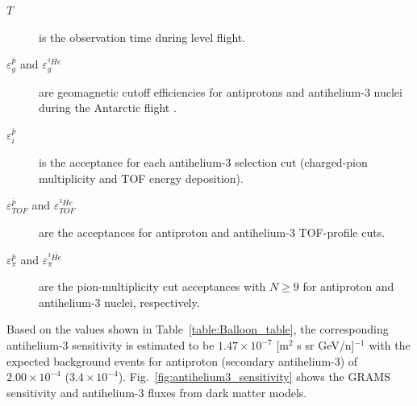 \begin{table}
\begin{description}
    \item[$T$] is the observation time during level flight.
    \item[$\varepsilon_g^{\bar{p}}$ and $\varepsilon_g^{^3\overline{He}}$] are geomagnetic cutoff efficiencies for antiprotons and antihelium-3 nuclei during the Antarctic flight \cite{vonDoetinchem:2017Id}.
    \item[$\varepsilon_i^{\bar{p}}$] is the acceptance for each antihelium-3 selection cut (charged-pion multiplicity and TOF energy deposition).
    \item[$\varepsilon_{TOF}^{\bar{p}}$ and $\varepsilon_{TOF}^{^3\overline{He}}$] are the acceptances for antiproton and antihelium-3 TOF-profile cuts.
    \item[$\varepsilon_{\pi}^{\bar{p}}$ and $\varepsilon_{\pi}^{^3\overline{He}}$] are the pion-multiplicity cut acceptances with $N\geq 9$ for antiproton and antihelium-3 nuclei, respectively.
\end{description}
\vspace{0.5cm} 
\caption{GRAMS \ac{LDB} antihelium-3 sensitivity calculation numerical values}
\label{table:Balloon_table}
\end{table}

Based on the values shown in Table~\ref{table:Balloon_table}, the corresponding antihelium-3 sensitivity is estimated to be $1.47\times10^{-7}$ [m$^2$ s sr GeV/n]$^{-1}$ with the expected background events for antiproton (secondary antihelium-3) of $2.00\times10^{-4}$ ($3.4\times10^{-4}$). Fig.~\ref{fig:antihelium3_sensitivity} shows the GRAMS sensitivity and antihelium-3 fluxes from dark matter models.

